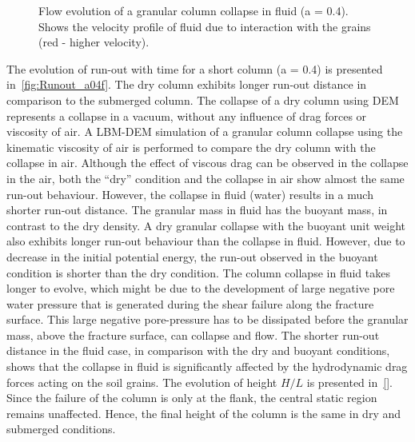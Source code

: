\begin{figure}
\caption{Flow evolution of a granular column collapse in fluid (a = 0.4). Shows 
the velocity profile of fluid due to interaction with the grains (red - higher 
velocity).}
\label{fig:a04_snapshots}
\end{figure}


The evolution of run-out with time for a short column (a = 0.4) is presented 
in~\cref{fig:Runout_a04f}. The dry column exhibits longer run-out distance in 
comparison to the submerged column. The collapse of a dry column using DEM 
represents a collapse in a vacuum, without any influence of drag forces or 
viscosity of air. A LBM-DEM simulation of a granular column collapse using the 
kinematic viscosity of air is performed to compare the dry column with the 
collapse in air. Although the effect of viscous drag can be observed in the 
collapse in the air, both the ``dry'' condition and the 
collapse in air show almost the same run-out behaviour. However, the collapse 
in fluid (water) results in a much shorter run-out distance. The granular mass 
in fluid has the buoyant mass, in contrast to the dry density. A dry granular 
collapse with the buoyant unit weight also 
exhibits longer run-out behaviour than the collapse in fluid. However, due to 
decrease in the initial potential energy, the run-out observed in the buoyant 
condition is shorter than the dry condition. The column collapse in fluid takes 
longer to evolve, which might be due to the development 
of large negative pore water pressure that is generated during the shear 
failure along the fracture surface. This large negative pore-pressure has to be 
dissipated before the granular mass, above the fracture surface, can collapse 
and flow. The shorter run-out distance in the fluid case, in comparison with 
the dry and buoyant conditions, shows that the collapse in fluid is 
significantly affected by the hydrodynamic drag forces acting on the soil 
grains. The evolution of height $H/L$ is presented in~\cref{}. Since the 
failure of the 
column is only at the flank, the central static region remains unaffected. 
Hence, the final height of the column is the same in dry and submerged 
conditions.

